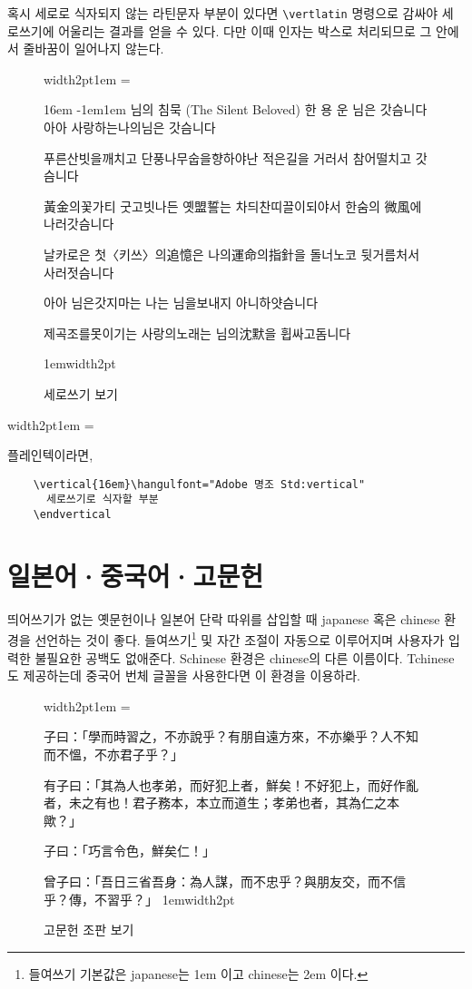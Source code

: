 \documentclass[a4paper]{article}
\newenvironment{plaintex}
  {\par\medskip\leavevmode\hbox\bgroup
    \color{white!80!black}\vrule width2pt\color{black}\kern1em
    \vbox\bgroup\hsize=\dimexpr\textwidth-12pt\relax
    \small
  }{\egroup\egroup\par\medskip}
\newenvironment{example}
  {\leavevmode\hbox\bgroup
    \color{white!80!black}\vrule width2pt\color{black}\kern1em
    \vbox\bgroup\hsize=\dimexpr\textwidth-24pt\relax
  }{\egroup\kern1em\color{white!80!black}\vrule width2pt\color{black}\egroup}
\def\cs#1{\texttt{\color{red!70!black}\textbackslash #1}}
\begin{document}
혹시 세로로 식자되지 않는 라틴문자 부분이 있다면
\cs{vertlatin} 명령으로 감싸야 세로쓰기에 어울리는
결과를 얻을 수 있다. 다만 이때 인자는 박스로 처리되므로
그 안에서 줄바꿈이 일어나지 않는다.

\begin{figure}
\begin{example}
\hfil\begin{vertical}{16em}
  \hangulmarks \hanjabyhangulfont \parindent-1em\leftskip1em
\noindent 님의 침묵 {\small(The Silent Beloved)}
\smallbreak
\hfil\hfil 한 용 운\hfil
\bigbreak
님은 갓슴니다 아아 사랑하는나의님은 갓슴니다\par
푸른산빗을깨치고 단풍나무숩을향하야난 적은길을 거러서 참어떨치고 갓슴니다\par
黃金의꽃가티 굿고빗나든 옛盟誓는 차듸찬띠끌이되야서 한숨의 微風에 나러갓슴니다\par
날카로은 첫〈키쓰〉의追憶은 나의運命의指針을 돌너노코 뒷거름처서 사러젓슴니다\par
\hellipsis\par
아아 님은갓지마는 나는 님을보내지 아니하얏슴니다\par
제곡조를못이기는 사랑의노래는 님의沈默을 휩싸고돔니다\par
\end{vertical}\hfil
\end{example}
\caption{세로쓰기 보기}\label{fig:vertical}
\end{figure}

\medskip
\begin{plaintex}
플레인텍이라면,
\begin{verbatim}
    \vertical{16em}\hangulfont="Adobe 명조 Std:vertical"
      세로쓰기로 식자할 부분
    \endvertical
\end{verbatim}
\end{plaintex}


\section{일본어·중국어·고문헌}
띄어쓰기가 없는 옛문헌이나 일본어 단락 따위를 삽입할 때
japanese 혹은 chinese 환경을 선언하는 것이 좋다.
들여쓰기\footnote {들여쓰기 기본값은 japanese는 1em 이고 chinese는 2em 이다.}
및 자간 조절이 자동으로 이루어지며
사용자가 입력한 불필요한 공백도 없애준다.
Schinese 환경은 chinese의 다른 이름이다.
Tchinese도 제공하는데 중국어 번체 글꼴을 사용한다면 이 환경을 이용하라.

\begin{figure}
  \begin{example}
    \chinese
子曰：「學而時習之，不亦說乎？有朋自遠方來，不亦樂乎？人不知而不慍，不亦君子乎？」

有子曰：「其為人也孝弟，而好犯上者，鮮矣！不好犯上，而好作亂者，未之有也！君子務本，本立而道生；孝弟也者，其為仁之本歟？」

子曰：「巧言令色，鮮矣仁！」

曾子曰：「吾日三省吾身：為人謀，而不忠乎？與朋友交，而不信乎？傳，不習乎？」
  \end{example}
\caption{고문헌 조판 보기}\label{fig:ancientdoc}
\end{figure}
\end{document}
